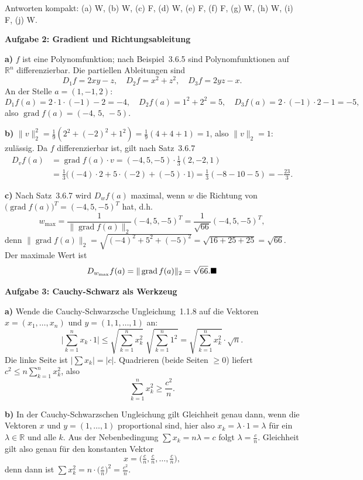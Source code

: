 \documentclass[a4paper,12pt]{article}
\providecommand{\qed}{\hfill\ensuremath{\blacksquare}}
\newcommand{\aufgabe}[2]{%
  \bigskip\par\noindent\textbf{Aufgabe #1: #2}\par\nobreak\medskip}
\begin{document}
\medskip
\noindent Antworten kompakt: (a) W, (b) W, (c) F, (d) W, (e) F, (f) F, (g) W, (h) W, (i) F, (j) W.

\aufgabe{2}{Gradient und Richtungsableitung}

\textbf{a)} $f$ ist eine Polynomfunktion; nach Beispiel~3.6.5 sind Polynomfunktionen auf $\mathbb{R}^n$ differenzierbar. Die partiellen Ableitungen sind
\[ D_1f=2xy-z,\quad D_2f=x^2+z^2,\quad D_3f=2yz-x. \]
An der Stelle $a=(1,-1,2)$:
\[ D_1f(a)=2\cdot1\cdot(-1)-2=-4,\quad D_2f(a)=1^2+2^2=5,\quad D_3f(a)=2\cdot(-1)\cdot2-1=-5, \]
also $\operatorname{grad} f(a)=(-4,\,5,\,-5)$.

\textbf{b)} $\|v\|_2^2=\tfrac19(2^2+(-2)^2+1^2)=\tfrac19(4+4+1)=1$, also $\|v\|_2=1$: zulässig. Da $f$ differenzierbar ist, gilt nach Satz~3.6.7
\begin{align*}
  D_v f(a)&=\operatorname{grad} f(a)\cdot v=(-4,5,-5)\cdot\tfrac13(2,-2,1)\\
  &=\tfrac13\bigl((-4)\cdot2+5\cdot(-2)+(-5)\cdot1\bigr)=\tfrac13(-8-10-5)=-\tfrac{23}{3}.
\end{align*}

\textbf{c)} Nach Satz~3.6.7 wird $D_w f(a)$ maximal, wenn $w$ die Richtung von $\bigl(\operatorname{grad} f(a)\bigr)^{T}=(-4,5,-5)^{T}$ hat, d.h.
\[ w_{\max}=\frac{1}{\|\operatorname{grad} f(a)\|_2}(-4,5,-5)^{T}=\frac{1}{\sqrt{66}}(-4,5,-5)^{T}, \]
denn $\|\operatorname{grad} f(a)\|_2=\sqrt{(-4)^2+5^2+(-5)^2}=\sqrt{16+25+25}=\sqrt{66}$. Der maximale Wert ist
\[ D_{w_{\max}}f(a)=\|\operatorname{grad} f(a)\|_2=\sqrt{66}. \qed \]

\aufgabe{3}{Cauchy-Schwarz als Werkzeug}

\textbf{a)} Wende die Cauchy-Schwarzsche Ungleichung~1.1.8 auf die Vektoren $x=(x_1,\dots,x_n)$ und $y=(1,1,\dots,1)$ an:
\[ \Big|\sum_{k=1}^n x_k\cdot 1\Big| \le \sqrt{\sum_{k=1}^n x_k^2}\;\sqrt{\sum_{k=1}^n 1^2}
   =\sqrt{\sum_{k=1}^n x_k^2}\cdot\sqrt{n}. \]
Die linke Seite ist $\big|\sum x_k\big|=|c|$. Quadrieren (beide Seiten $\ge0$) liefert $c^2\le n\sum_{k=1}^n x_k^2$, also
\[ \sum_{k=1}^n x_k^2 \ge \frac{c^2}{n}. \]

\textbf{b)} In der Cauchy-Schwarzschen Ungleichung gilt Gleichheit genau dann, wenn die Vektoren $x$ und $y=(1,\dots,1)$ proportional sind, hier also $x_k=\lambda\cdot 1=\lambda$ für ein $\lambda\in\mathbb{R}$ und alle $k$. Aus der Nebenbedingung $\sum x_k = n\lambda = c$ folgt $\lambda=\tfrac{c}{n}$. Gleichheit gilt also genau für den konstanten Vektor
\[ x=\Big(\tfrac{c}{n},\tfrac{c}{n},\dots,\tfrac{c}{n}\Big), \]
denn dann ist $\sum x_k^2 = n\cdot\big(\tfrac{c}{n}\big)^2=\tfrac{c^2}{n}$.
\end{document}
